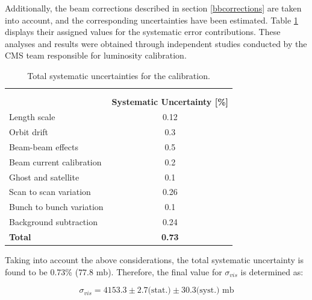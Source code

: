 Additionally, the beam corrections described in section \ref{bbcorrections} are taken into account, and the corresponding uncertainties have been estimated. Table \ref{systematics} displays their assigned values for the systematic error contributions. These analyses and results were obtained through independent studies conducted by the CMS team responsible for luminosity calibration.

\begin{table}[h!]
\centering
\caption[Systematic Uncertainties]{Total systematic uncertainties for the calibration.}
\label{systematics}
\begin{tabular}{lc}
                               & \multicolumn{1}{l}{}       \\
                               & \multicolumn{1}{l}{}       \\
            & \textbf{Systematic Uncertainty [\%]}  \\ 
\toprule
Length scale                   & 0.12                        \\
Orbit drift                    & 0.3                        \\
Beam-beam effects              & 0.5                        \\
Beam current calibration       & 0.2                        \\
Ghost and satellite            & 0.1                        \\
Scan to scan variation         & 0.26                        \\
Bunch to bunch variation       & 0.1                        \\
Background subtraction         & 0.24                          \\ 
\hline
\textbf{Total}                 & \textbf{0.73}               
\end{tabular}
\end{table}

Taking into account the above considerations, the total systematic uncertainty is found to be 0.73\% ($77.8 \text{ mb}$). Therefore, the final value for $\sigma_{vis}$ is determined as:

\begin{equation}
\sigma_{vis} = 4153.3 \pm 2.7 \text{(stat.)} \pm 30.3 \text{(syst.) mb}
\end{equation}
